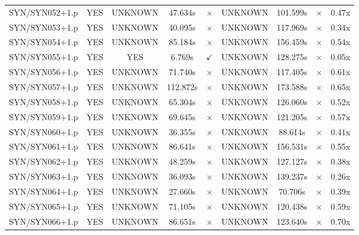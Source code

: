 \documentclass[a4paper,10pt]{article}
\begin{document}
\begin{longtable}{lcccccccc}
SYN/SYN052+1.p & YES & UNKNOWN & 47.634s & \cellcolor{mismatchcolor}$\times$ & UNKNOWN & 101.599s & \cellcolor{mismatchcolor}$\times$ & 0.47x \\
SYN/SYN053+1.p & YES & UNKNOWN & 40.095s & \cellcolor{mismatchcolor}$\times$ & UNKNOWN & 117.969s & \cellcolor{mismatchcolor}$\times$ & 0.34x \\
SYN/SYN054+1.p & YES & UNKNOWN & 85.184s & \cellcolor{mismatchcolor}$\times$ & UNKNOWN & 156.459s & \cellcolor{mismatchcolor}$\times$ & 0.54x \\
SYN/SYN055+1.p & YES & YES & 6.769s & \cellcolor{matchcolor}$\checkmark$ & UNKNOWN & 128.275s & \cellcolor{mismatchcolor}$\times$ & 0.05x \\
SYN/SYN056+1.p & YES & UNKNOWN & 71.740s & \cellcolor{mismatchcolor}$\times$ & UNKNOWN & 117.405s & \cellcolor{mismatchcolor}$\times$ & 0.61x \\
SYN/SYN057+1.p & YES & UNKNOWN & 112.872s & \cellcolor{mismatchcolor}$\times$ & UNKNOWN & 173.588s & \cellcolor{mismatchcolor}$\times$ & 0.65x \\
SYN/SYN058+1.p & YES & UNKNOWN & 65.304s & \cellcolor{mismatchcolor}$\times$ & UNKNOWN & 126.060s & \cellcolor{mismatchcolor}$\times$ & 0.52x \\
SYN/SYN059+1.p & YES & UNKNOWN & 69.645s & \cellcolor{mismatchcolor}$\times$ & UNKNOWN & 121.205s & \cellcolor{mismatchcolor}$\times$ & 0.57x \\
SYN/SYN060+1.p & YES & UNKNOWN & 36.355s & \cellcolor{mismatchcolor}$\times$ & UNKNOWN & 88.614s & \cellcolor{mismatchcolor}$\times$ & 0.41x \\
SYN/SYN061+1.p & YES & UNKNOWN & 86.641s & \cellcolor{mismatchcolor}$\times$ & UNKNOWN & 156.531s & \cellcolor{mismatchcolor}$\times$ & 0.55x \\
SYN/SYN062+1.p & YES & UNKNOWN & 48.259s & \cellcolor{mismatchcolor}$\times$ & UNKNOWN & 127.127s & \cellcolor{mismatchcolor}$\times$ & 0.38x \\
SYN/SYN063+1.p & YES & UNKNOWN & 36.093s & \cellcolor{mismatchcolor}$\times$ & UNKNOWN & 139.237s & \cellcolor{mismatchcolor}$\times$ & 0.26x \\
SYN/SYN064+1.p & YES & UNKNOWN & 27.660s & \cellcolor{mismatchcolor}$\times$ & UNKNOWN & 70.706s & \cellcolor{mismatchcolor}$\times$ & 0.39x \\
SYN/SYN065+1.p & YES & UNKNOWN & 71.105s & \cellcolor{mismatchcolor}$\times$ & UNKNOWN & 120.438s & \cellcolor{mismatchcolor}$\times$ & 0.59x \\
SYN/SYN066+1.p & YES & UNKNOWN & 86.651s & \cellcolor{mismatchcolor}$\times$ & UNKNOWN & 123.640s & \cellcolor{mismatchcolor}$\times$ & 0.70x \\

\end{longtable}
\end{document}
